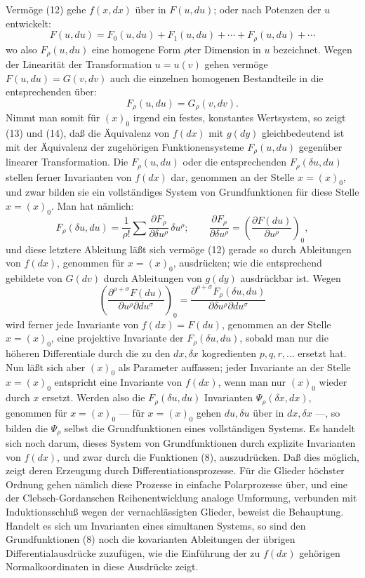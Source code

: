 Vermöge (12) gehe \(f(x,dx)\) über in \(F(u,du)\); oder nach Potenzen
der \(u\) entwickelt:
\begin{equation}
F(u,du)=F_0(u,du)+F_1(u,du)+\cdots+F_\rho(u,du)+\cdots
\tag{13}
\end{equation}
wo also \(F_\rho(u,du)\) eine homogene Form \(\rho\)ter Dimension in
\(u\) bezeichnet. Wegen der Linearität der Transformation \(u=u(v)\)
gehen vermöge \(F(u,du)=G(v,dv)\) auch die einzelnen homogenen
Bestandteile in die entsprechenden über:
\begin{equation}
F_\rho(u,du)=G_\rho(v,dv).
\tag{14}
\end{equation}
Nimmt man somit für \((x)_0\) irgend ein festes, konstantes
Wertsystem, so zeigt (13) und (14), daß die Äquivalenz von \(f(dx)\)
mit \(g(dy)\) gleichbedeutend ist mit der Äquivalenz der zugehörigen
Funktionensysteme \(F_\rho(u,du)\) gegenüber linearer Transformation.
Die \(F_\rho(u,du)\) oder die entsprechenden \(F_\rho(\delta u,du)\)
stellen ferner Invarianten von \(f(dx)\) dar, genommen an der Stelle
\(x=(x)_0\), und zwar bilden sie ein vollständiges System von
Grundfunktionen für diese Stelle \(x=(x)_0\). Man hat nämlich:
\[
F_\rho(\delta u,du)=\frac1{\rho!}\sum
\frac{\partial F_\rho}{\partial \delta u^\rho}\,\delta u^\rho;
\qquad
\frac{\partial F_\rho}{\partial \delta u^\rho}
=\left(\frac{\partial F(du)}{\partial u^\rho}\right)_0,
\]
und diese letztere Ableitung läßt sich vermöge (12) gerade so durch
Ableitungen von \(f(dx)\), genommen für \(x=(x)_0\), ausdrücken; wie
die entsprechend gebildete von \(G(dv)\) durch Ableitungen von \(g(dy)\)
ausdrückbar ist. Wegen
\[
\left(\frac{\partial^{\rho+\sigma}F(du)}
{\partial u^\rho\partial du^\sigma}\right)_0
=
\frac{\partial^{\rho+\sigma}F_\rho(\delta u,du)}
{\partial\delta u^\rho\partial du^\sigma}
\]
wird ferner jede Invariante von \(f(dx)=F(du)\), genommen an der Stelle
\(x=(x)_0\), eine projektive Invariante der \(F_\rho(\delta u,du)\),
sobald man nur die höheren Differentiale durch die zu den \(dx,\delta x\)
kogredienten \(p,q,r,\ldots\) ersetzt hat. Nun läßt sich aber \((x)_0\)
als Parameter auffassen; jeder Invariante an der Stelle \(x=(x)_0\)
entspricht eine Invariante von \(f(dx)\), wenn man nur \((x)_0\) wieder
durch \(x\) ersetzt. Werden also die \(F_\rho(\delta u,du)\) Invarianten
\(\Psi_\rho(\delta x,dx)\), genommen für \(x=(x)_0\) --- für \(x=(x)_0\)
gehen \(du,\delta u\) über in \(dx,\delta x\) ---, so bilden die
\(\Psi_\rho\) selbst die Grundfunktionen eines vollständigen Systems.
Es handelt sich noch darum, dieses System von Grundfunktionen durch
explizite Invarianten von \(f(dx)\), und zwar durch die Funktionen (8),
auszudrücken. Daß dies möglich, zeigt deren Erzeugung durch
Differentiationsprozesse. Für die Glieder höchster Ordnung gehen
nämlich diese Prozesse in einfache Polarprozesse über, und eine der
Clebsch-Gordanschen Reihenentwicklung analoge Umformung, verbunden mit
Induktionsschluß wegen der vernachlässigten Glieder, beweist die
Behauptung. Handelt es sich um Invarianten eines simultanen Systems, so
sind den Grundfunktionen (8) noch die kovarianten Ableitungen der
übrigen Differentialausdrücke zuzufügen, wie die Einführung der zu
\(f(dx)\) gehörigen Normalkoordinaten in diese Ausdrücke zeigt.

